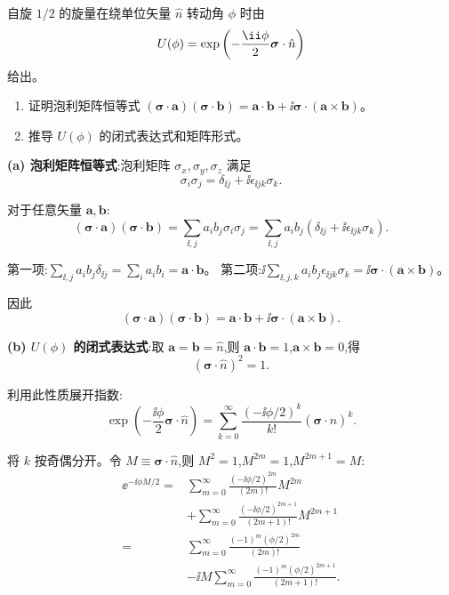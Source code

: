 \begin{question}
自旋 $1/2$ 的旋量在绕单位矢量 $\hat n$ 转动角 $\phi$ 时由
\[
U(\phi)=\exp\left(-{\ii\phi\over2}\boldsymbol\sigma\cdot\hat n\right)
\]
给出。
\begin{enumerate}
\item 证明泡利矩阵恒等式 $(\boldsymbol\sigma\cdot\mathbf a)(\boldsymbol\sigma\cdot\mathbf b)=\mathbf a\cdot\mathbf b+\ii\boldsymbol\sigma\cdot(\mathbf a\times\mathbf b)$。
\item 推导 $U(\phi)$ 的闭式表达式和矩阵形式。
\end{enumerate}
\begin{solution}
	\textbf{(a) 泡利矩阵恒等式}:泡利矩阵 $\sigma_x,\sigma_y,\sigma_z$ 满足
	\[
	\sigma_i\sigma_j = \delta_{\ii j} + \ii\epsilon_{\ii jk}\sigma_k.
	\]

	对于任意矢量 $\mathbf a,\mathbf b$:
	\[
	(\boldsymbol\sigma\cdot\mathbf a)(\boldsymbol\sigma\cdot\mathbf b)
	= \sum_{\ii,j} a_i b_j \sigma_i\sigma_j
	= \sum_{\ii,j} a_i b_j (\delta_{\ii j} + \ii\epsilon_{\ii jk}\sigma_k).
	\]

	第一项:$\sum_{\ii,j} a_i b_j \delta_{\ii j} = \sum_i a_i b_i = \mathbf a\cdot\mathbf b$。
	第二项:$\ii\sum_{\ii,j,k} a_i b_j \epsilon_{\ii jk}\sigma_k = \ii\boldsymbol\sigma\cdot(\mathbf a\times\mathbf b)$。

	因此
	\[
	\boxed{(\boldsymbol\sigma\cdot\mathbf a)(\boldsymbol\sigma\cdot\mathbf b)
	= \mathbf a\cdot\mathbf b + \ii\boldsymbol\sigma\cdot(\mathbf a\times\mathbf b)}.
	\]

	\textbf{(b) $U(\phi)$ 的闭式表达式}:取 $\mathbf a=\mathbf b=\hat n$,则 $\mathbf a\cdot\mathbf b=1$,$\mathbf a\times\mathbf b=0$,得
	\[
	(\boldsymbol\sigma\cdot\hat n)^2 = 1.
	\]

	利用此性质展开指数:
	\[
	\exp\!\left(-\frac{\ii\phi}{2}\boldsymbol\sigma\cdot\hat n\right)
	= \sum_{k=0}^\infty \frac{(-\ii\phi/2)^k}{k!}(\boldsymbol\sigma\cdot\hat n)^k.
	\]

	将 $k$ 按奇偶分开。令 $M \equiv \boldsymbol\sigma\cdot\hat n$,则 $M^2=1$,$M^{2m}=1$,$M^{2m+1}=M$:
	\[
	\begin{aligned}
	\ee^{-\ii\phi M/2}={}&\sum_{m=0}^\infty \frac{(-\ii\phi/2)^{2m}}{(2m)!} M^{2m}\\
	&+\sum_{m=0}^\infty \frac{(-\ii\phi/2)^{2m+1}}{(2m+1)!} M^{2m+1}\\
	={}&\sum_{m=0}^\infty \frac{(-1)^m(\phi/2)^{2m}}{(2m)!}\\
	&-\ii M\sum_{m=0}^\infty \frac{(-1)^m(\phi/2)^{2m+1}}{(2m+1)!}.
	\end{aligned}
	\]


\end{solution}
\end{question}
